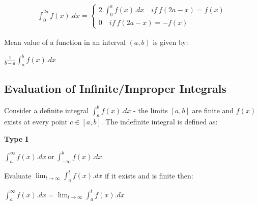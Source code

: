 \vspace{5mm}

\begin{align}
\int^{2a}_{0}f(x).dx = 
\begin{cases}
2.\int^{a}_{0}f(x).dx \quad if \: f(2a-x) = f(x) \\
0 \quad if \: f(2a-x) = -f(x)
\end{cases}
\end{align}

\vspace{5mm}

Mean value of a function in an interval $(a,b)$ is given by:

\begin{tcolorbox}
\begin{center}
$ \displaystyle \frac{1}{b-a} \int_{a}^{b} f(x).dx $
\end{center}
\end{tcolorbox}

\subsection{ Evaluation of Infinite/Improper Integrals}
Consider a definite integral $ \displaystyle \int_{a}^{b} f(x).dx $ - the limits $[a,b]$ are finite and $f(x)$ exists at every point $c \in [a,b]$. The indefinite integral is defined as: \\

\vspace{5mm}

\noindent
\textbf{Type I}
\begin{tcolorbox}
\begin{center}
$ \displaystyle \int_{a}^{\infty} f(x).dx \: \text{or} \: \int_{-\infty}^{b} f(x).dx $
\end{center}
\end{tcolorbox}

\vspace{2mm}
Evaluate $ \displaystyle \lim_{t \to \infty}\int_{a}^{t} f(x).dx $ if it exists and is finite then: \\[3mm]
\begin{tcolorbox}
\begin{center}
$ \displaystyle \int_{a}^{\infty} f(x).dx = \lim_{t \to \infty} \int_{a}^{t} f(x).dx $
\end{center}
\end{tcolorbox}

\vspace{2mm}

